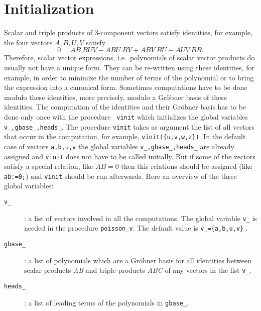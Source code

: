 \documentclass[12pt]{article}
\begin{document}
\section{Initialization}
Scalar and triple products of 3-component vectors satisfy
identities, for example, the four vectors $A,B,U,V$ satisfy
\[ 0 = AB\ BUV - ABU\ BV + ABV\ BU - AUV\ BB. \]
Therefore, scalar vector expressions, i.e.\ polynomials of scalar
vector products do usually not have a unique form. They can be
re-written using these identities, for example, in order to minimize
the number of terms of the polynomial or to bring the expression into
a canonical form. Sometimes computations have to
be done modulo these identities, more precisely, modulo a Gr\"{o}bner
basis of these identities. The computation of the identities and their
Gr\"{o}bner basis has to be done only once with the procedure {\tt
vinit} which initializes the global variables {\tt v\_,gbase\_,heads\_}.
The procedure {\tt vinit} takes as argument the list of
all vectors that occur in the computation, for example,
{\tt vinit(\{u,v,w,z\})}. In the default case of
vectors {\tt a,b,u,v} the global variables {\tt v\_,gbase\_,heads\_}
are already assigned and {\tt vinit} does not have to be called
initially. But if some of the vectors satisfy a special relation, like
$AB=0$ then this relations should be assigned (like {\tt ab:=0;})
and {\tt vinit} should be run afterwards. Here an overview of the three global
variables:
\begin{description}
\item[{\tt v\_}] : a list of vectors involved in all the computations.
      The global variable {\tt v\_} is needed in the procedure
      {\tt poisson\_v}. The default value is {\tt v\_=\{a,b,u,v\}} .
\item[{\tt gbase\_}] : a list of polynomials which are a Gr\"{o}bner
      basis for all identities between scalar products %
      {\it AB} and triple products {\it ABC} %
      of any vectors in the list {\tt v\_}.
\item[{\tt heads\_}] : a list of leading terms of the polynomials in
      {\tt gbase\_}.
\end{description}
\end{document}
